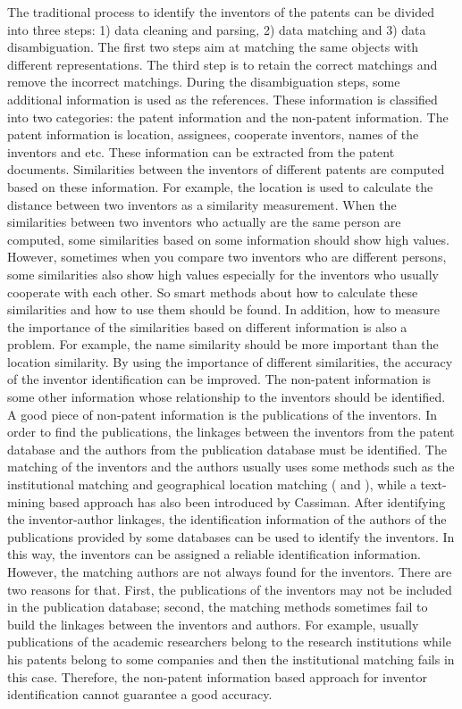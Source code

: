The traditional process to identify the inventors of the patents can be divided into three steps: 1) data cleaning and parsing, 2) data matching and 3) data disambiguation\cite{iaifs}.  The first two steps aim at matching the same objects with different representations. The third step is to retain the correct matchings and remove the incorrect matchings. During the disambiguation steps, some additional information is used as the references. These information is classified into two categories: the patent information and the non-patent information. The patent information is location, assignees, cooperate inventors, names of the inventors and etc. These information can be extracted from the patent documents.  Similarities between the inventors of different patents are computed based on these information. For example,  the location is used to calculate the distance between two inventors as a similarity measurement. When the similarities between two inventors who actually are the same person are computed, some similarities based on some information should show high values. However, sometimes when you compare two inventors who are different persons, some similarities also show high values especially for the inventors who usually cooperate with each other. So smart methods about how to calculate these similarities and how to use them should be found. In addition, how to measure the importance of the similarities based on different information is also a problem. For example, the name similarity should be more important than the location similarity. By using the importance of different similarities, the accuracy of the inventor identification can be improved. The non-patent information is some other information whose relationship to the inventors should be identified. A good piece of non-patent information is the publications of the inventors. In order to find the publications, the linkages between the inventors from the patent database and the authors from the publication database must be identified.  The matching of the inventors and the authors usually uses some methods such as the institutional matching and geographical location matching (\cite{iaifs} and \cite{Boyack2008173}), while a text-mining based approach has also been introduced by Cassiman\cite{MISLT}.  After identifying the inventor-author linkages, the identification information of the authors of the publications  provided by some databases can be used to identify the inventors. In this way, the inventors can be assigned a reliable identification information. However, the matching authors are not always found for the inventors. There are two reasons for that. First, the publications of the inventors may not be included in the publication database; second, the matching methods sometimes fail  to build the linkages between the inventors and authors. For example, usually publications of the academic researchers belong to the research institutions while his patents belong to some companies and  then the institutional matching fails in this case. Therefore, the non-patent information based approach for inventor identification cannot guarantee a good accuracy.

